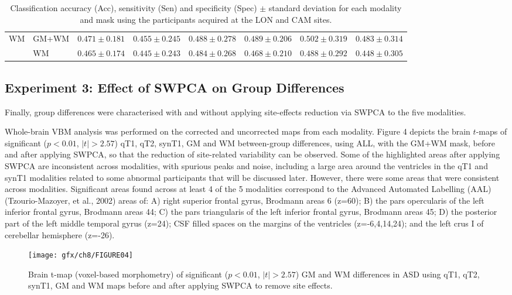 \begin{table}
\begin{tabularx}{\textwidth}{XX|XXX|XXX}
		\midrule
		\multirow{2}{*}{\ac{WM}} &GM+WM &		$ 0.471 \pm 0.181 $ & $ 0.455 \pm 0.245 $ & $ 0.488 \pm 0.278 $ & $ 0.489 \pm 0.206 $ & $ 0.502 \pm 0.319 $ &  $ 0.483 \pm 0.314 $ \\
		&		WM &		$ 0.465 \pm 0.174 $ & $ 0.445 \pm 0.243 $ & $ 0.484 \pm 0.268 $ & $ 0.468 \pm 0.210 $ & $ 0.488 \pm 0.292 $ &  $ 0.448 \pm 0.305 $ \\
		\bottomrule
	\end{tabularx}
	\caption{Classification accuracy (Acc), sensitivity (Sen) and specificity (Spec) $\pm$ standard deviation for each modality and mask using the participants acquired at the LON and CAM sites.}
	\label{tab:swpcaLONCAM}
\end{table}



\subsection{Experiment 3: Effect of SWPCA on Group Differences}\label{sec:swpcaE3}
Finally, group differences were characterised with and without applying
site-effects reduction via SWPCA to the five modalities. 

Whole-brain \ac{VBM} analysis was performed on the corrected and uncorrected
maps from each modality. Figure 4 depicts the brain $t$-maps
of significant ($p<0.01$, $|t|>2.57$) \ac{qT1}, \ac{qT2}, \ac{synT1}, \ac{GM} and \ac{WM} between-group differences, using ALL, with the GM+WM mask,
before and after applying \ac{SWPCA}, so that the reduction of site-related
variability can be observed. Some of the highlighted areas after
applying \ac{SWPCA} are inconsistent across modalities, with spurious peaks
and noise, including a large area around the ventricles in the \ac{qT1} and
\ac{synT1} modalities related to some abnormal participants that will be
discussed later. However, there were some areas that were consistent
across modalities. Significant areas found across at least 4 of the 5
modalities correspond to the Advanced Automated Labelling (AAL)
(Tzourio-Mazoyer, et al., 2002) areas of: A) right superior frontal
gyrus, Brodmann areas 6 (z=60); B) the pars opercularis of the left
inferior frontal gyrus, Brodmann areas 44; C) the pars triangularis of
the left inferior frontal gyrus, Brodmann areas 45; D) the posterior
part of the left middle temporal gyrus (z=24); CSF filled spaces on the
margins of the ventricles (z=-6,4,14,24); and the left crus I of
cerebellar hemisphere (z=-26).

\begin{figure}
	\centering
	\texttt{[image: gfx/ch8/FIGURE04]}
	\caption{Brain t-map (voxel-based morphometry) of significant ($p<0.01$, $|t|>2.57$) \ac{GM} and \ac{WM} differences in \ac{ASD} using \ac{qT1}, \ac{qT2}, \ac{synT1}, \ac{GM} and \ac{WM} maps before and after applying \ac{SWPCA} to remove site effects.}
	\label{fig:swpcaFIGURE04}
\end{figure}

